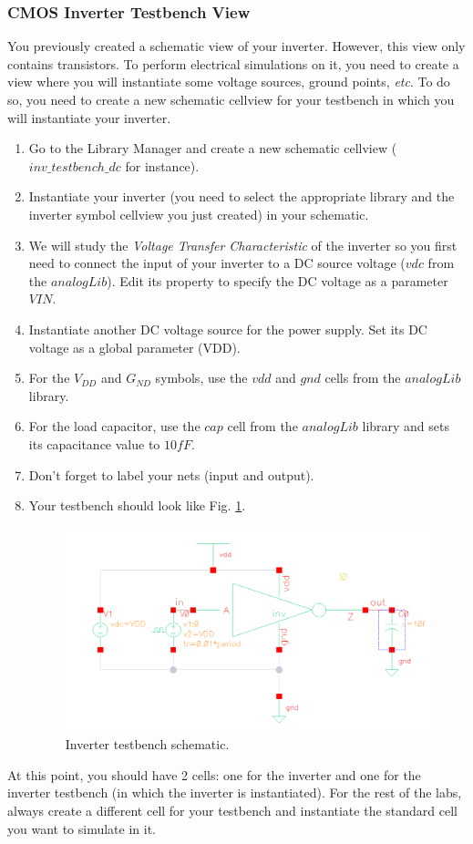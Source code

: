 \subsubsection{CMOS Inverter Testbench View}	
You previously created a schematic view of your inverter. However, this view only contains transistors. To perform electrical simulations on it, you need to create a view where you will instantiate some voltage sources, ground points, \textit{etc}. To do so, you need to create a new schematic cellview for your testbench in which you will instantiate your inverter.
\begin{enumerate}
	\item Go to the Library Manager and create a new schematic cellview ($inv\_testbench\_dc$ for instance). 
	\item Instantiate your inverter (you need to select the appropriate library and the inverter symbol cellview you just created) in your schematic.
	\item We will study the \textit{Voltage Transfer Characteristic} of the inverter so you first need to connect the input of your inverter to a DC source voltage ($vdc$ from the $analogLib$). Edit its property to specify the DC voltage as a parameter $VIN$.
	\item Instantiate another DC voltage source for the power supply. Set its DC voltage as a global parameter (VDD). 
	\item For the $V_{DD}$ and $G_{ND}$ symbols, use the $vdd$ and $gnd$ cells from the $analogLib$ library.
	\item For the load capacitor, use the $cap$ cell from the $analogLib$ library and sets its capacitance value to $10f F$.
	\item Don't forget to label your nets (input and output).
	\item Your testbench should look like Fig. \ref{fig_invtb}.
	
	\begin{figure}[!h]
		\centering
		\includegraphics[scale=0.45]{figures/lab1_schematic_sim/inv_tb.pdf}
		\caption{Inverter testbench schematic.}
		\label{fig_invtb}
	\end{figure}
\end{enumerate} 
\begin{remark}
	At this point, you should have 2 cells: one for the inverter and one for the inverter testbench (in which the inverter is instantiated). For the rest of the labs, always create a different cell for your testbench and instantiate the standard cell you want to simulate in it.
\end{remark}
